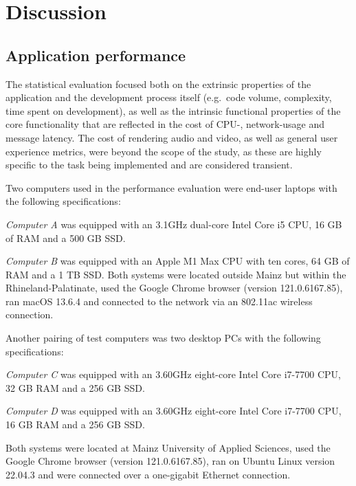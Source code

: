\chapter{Discussion}
\label{ch:discussion}


\section{Application performance}
\label{sec:statistics}

The statistical evaluation focused both on the extrinsic properties of the application and the development process itself (e.g.\ code volume, complexity, time spent on development), as well as the intrinsic functional properties of the core functionality that are reflected in the cost of \ac{CPU}-, network-usage and message latency.
The cost of rendering audio and video, as well as general user experience metrics, were beyond the scope of the study, as these are highly specific to the task being implemented and are considered transient.

Two computers used in the performance evaluation were end-user laptops with the following specifications:

\emph{Computer A} was equipped with an 3.1GHz dual-core Intel Core i5 \ac{CPU}, 16 \ac{GB} of \ac{RAM} and a 500 \ac{GB} \ac{SSD}.

\emph{Computer B} was equipped with an Apple M1 Max \ac{CPU} with ten cores, 64 \ac{GB} of \ac{RAM} and a 1 \ac{TB} \ac{SSD}.
Both systems were located outside Mainz but within the Rhineland-Palatinate, used the Google Chrome browser (version 121.0.6167.85), ran macOS 13.6.4 and connected to the network via an 802.11ac wireless connection.

Another pairing of test computers was two desktop \acp{PC} with the following specifications:

\emph{Computer C} was equipped with an 3.60GHz eight-core Intel Core i7-7700 \ac{CPU}, 32 \ac{GB} \ac{RAM} and a 256 \ac{GB} \ac{SSD}.

\emph{Computer D} was equipped with an 3.60GHz eight-core Intel Core i7-7700 \ac{CPU}, 16 \ac{GB} \ac{RAM} and a 256 \ac{GB} \ac{SSD}.

Both systems were located at Mainz University of Applied Sciences, used the Google Chrome browser (version 121.0.6167.85), ran on Ubuntu Linux version 22.04.3 and were connected over a one-gigabit Ethernet connection.

